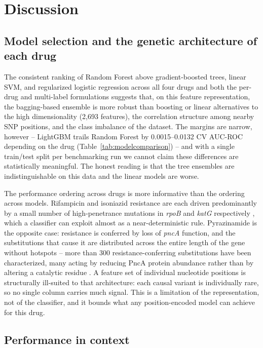 \section{Discussion}

\subsection{Model selection and the genetic architecture of each drug}

The consistent ranking of Random Forest above gradient-boosted trees, linear SVM, and regularized logistic regression across all four drugs and both the per-drug and multi-label formulations suggests that, on this feature representation, the bagging-based ensemble is more robust than boosting or linear alternatives to the high dimensionality (2{,}693 features), the correlation structure among nearby SNP positions, and the class imbalance of the dataset. The margins are narrow, however -- LightGBM trails Random Forest by 0.0015--0.0132 CV AUC-ROC depending on the drug (Table~\ref{tab:modelcomparison}) -- and with a single train/test split per benchmarking run we cannot claim these differences are statistically meaningful. The honest reading is that the tree ensembles are indistinguishable on this data and the linear models are worse.

The performance ordering across drugs is more informative than the ordering across models. Rifampicin and isoniazid resistance are each driven predominantly by a small number of high-penetrance mutations in \emph{rpoB} and \emph{katG} respectively \cite{who2023catalogue,walker2015whole}, which a classifier can exploit almost as a near-deterministic rule. Pyrazinamide is the opposite case: resistance is conferred by loss of \emph{pncA} function, and the substitutions that cause it are distributed across the entire length of the gene without hotspots -- more than 300 resistance-conferring substitutions have been characterized, many acting by reducing PncA protein abundance rather than by altering a catalytic residue \cite{yadon2017pnca}. A feature set of individual nucleotide positions is structurally ill-suited to that architecture: each causal variant is individually rare, so no single column carries much signal. This is a limitation of the representation, not of the classifier, and it bounds what any position-encoded model can achieve for this drug.

\subsection{Performance in context}

